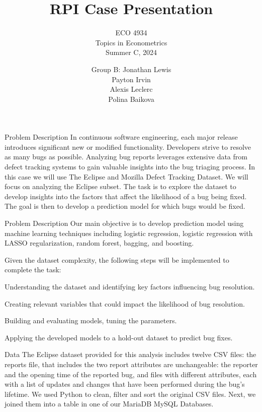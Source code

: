 \documentclass[10pt]{beamer}
\title{RPI Case Presentation}
\subtitle{ECO 4934 \\ Topics in Econometrics \\ Summer C, 2024}
\author{Group B: Jonathan Lewis \\ Payton Irvin \\ Alexis Leclerc \\ Polina Baikova}
\begin{document}
	
\begin{frame}
\titlepage
\end{frame}
	
	
\begin{frame}[t]{Problem Description}\justifying \vspace{20pt}
	In continuous software engineering, each major release introduces significant new or modified functionality. Developers strive to resolve as many bugs as possible. Analyzing bug reports leverages extensive data from defect tracking systems to gain valuable insights into the bug triaging process.
	\vskip 16pt
	In this case we will use The Eclipse and Mozilla Defect Tracking Dataset. We will focus on analyzing the Eclipse subset. The task is to explore the dataset to develop insights into the factors that affect the likelihood of a bug being fixed. The goal is then to develop a prediction model for which bugs would be fixed.
	
\end{frame}


\begin{frame}[t]{Problem Description}\justifying \vspace{2pt}
	Our main objective is to develop prediction model using machine learning techniques including logistic regression, logistic regression with LASSO regularization, random forest, bagging, and boosting.  
	
	Given the dataset complexity, the following steps will be implemented to complete the task: 
	\begin{description}[font=$\bullet$~\normalfont\scshape\color{red!50!black}]
		\item [Exploratory Data Analysis:] Understanding the dataset and identifying key factors influencing bug resolution.
		\item [Feature Engineering:] Creating relevant variables that could impact the likelihood of bug resolution.
		\item [Model Development:] Building and evaluating models, tuning the parameters. 
		\item [Model Predictions:] Applying the developed models to a hold-out dataset to predict bug fixes.
		
	\end{description}
\end{frame}


\begin{frame}[t]{Data}\justifying \vspace{20pt}
	The Eclipse dataset provided for this analysis includes twelve CSV files: the reports file, that includes the two report attributes are unchangeable: the reporter and the opening time of the reported bug, and files with different attributes, each with a list of updates and changes that have been performed during the bug's lifetime.
	\vskip 16pt  
	We used Python to clean, filter and sort the original CSV files. Next, we joined them into a table in one of our MariaDB MySQL Databases.  
\end{frame}
\end{document}
